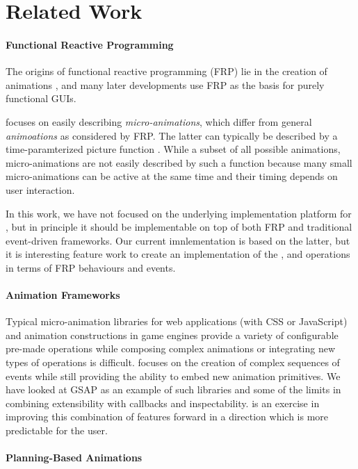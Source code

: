 \section{Related Work}
\label{sec:related}

\paragraph{Functional Reactive Programming}
The origins of functional reactive programming (FRP) lie in the creation of
animations \cite{DBLP:conf/icfp/ElliottH97}, and many later developments use
FRP as the basis for purely functional GUIs. 

\dsl{} focuses on easily describing \emph{micro-animations}, which differ from general
\emph{animoations} as considered by FRP. The latter can typically be described
by a time-paramterized picture function . While a subset of
all possible animations, micro-animations are not easily described by such a
function because many small micro-animations can be active at the same time and
their timing depends on user interaction.

In this work, we have not focused on the underlying implementation platform for
\dsl{}, but in principle it should be implementable on top of both FRP and
traditional event-driven frameworks. Our current imnlementation is based on the
latter, but it is interesting feature work to create an implementation of the
,  and  operations in terms of FRP
behaviours and events.

\paragraph{Animation Frameworks}

Typical micro-animation libraries for web applications (with CSS or JavaScript)
and animation constructions in game engines provide a variety of configurable
pre-made operations while composing complex animations or integrating new types
of operations is difficult. \dsl{} focuses on the creation of complex sequences
of events while still providing the ability to embed new animation primitives.
We have looked at GSAP as an example of such libraries and some of the limits
in combining extensibility with callbacks and inspectability. \dsl{} is an
exercise in improving this combination of features forward in a direction which
is more predictable for the user.

\paragraph{Planning-Based Animations}

